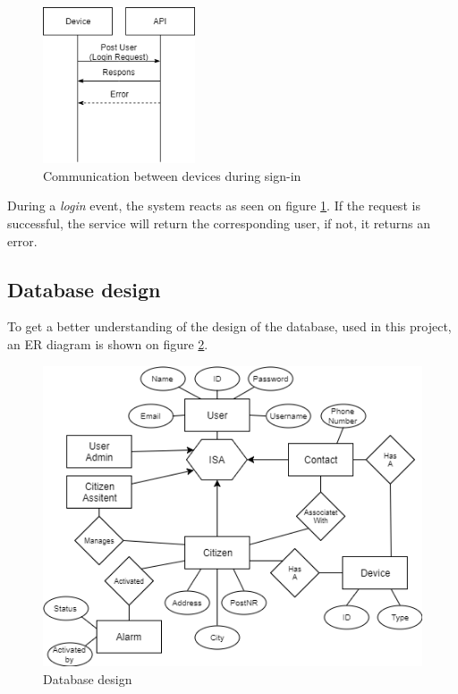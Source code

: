 \begin{figure}[H]
    \centering
    \includegraphics[width=0.4\textwidth]{Figures/Device-Api.png}
    \caption{Communication between devices during sign-in}
    \label{fig:post-sign-in}
\end{figure}

During a \textit{login} event, the system reacts as seen on figure \ref{fig:post-sign-in}. If the request is successful, the service will return the corresponding user, if not, it returns an error.

\subsection{Database design} \label{sec:databasedesign}
To get a better understanding of the design of the database, used in this project, an ER diagram is shown on figure \ref{fig:database}.

\begin{figure}[H]
    \centering
    \includegraphics[width=1.0\textwidth]{Figures/Database.png}
    \caption{Database design}
    \label{fig:database}
\end{figure} 

